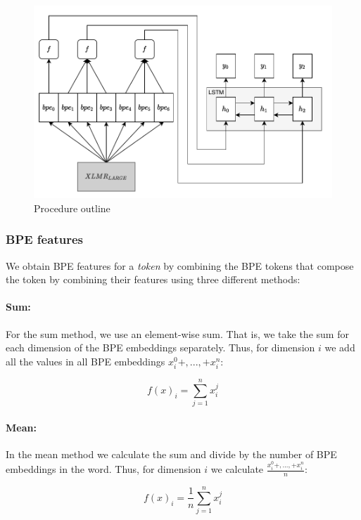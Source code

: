 \documentclass[11pt]{article}
\begin{document}
	\begin{figure}[h!]
		\centering
		\includegraphics[scale=0.2]{model_outline-5.pdf}
		\caption{\label{fig:model} Procedure outline}
	\end{figure}
	
	\subsubsection{BPE features} 	
	
	We obtain BPE features for a \textit{token} by combining the
        BPE tokens that compose the token by combining their features
        using three different methods:
	
	\paragraph{Sum:} For the sum method, we use an element-wise
        sum. That is, we take the sum for each dimension of the BPE
        embeddings separately. Thus, for dimension $i$ we add all the
        values in all BPE embeddings $x_i^0 + ,..., + x_i^n$:
	
	\begin{equation}
	f(x)_i = \sum_{j=1}^{n} x_i^j
	\end{equation}
	

	\paragraph{Mean:} In the mean method we calculate the sum and
        divide by the number of BPE embeddings in the word. Thus, for
        dimension $i$ we calculate $\frac{x_i^0 + ,..., + x_i^n}{n}$:
	
	\begin{equation}
	f(x)_{i} = \frac{1}{n}\sum_{j=1}^{n} x_i^j
	\end{equation}
	
\end{document}
